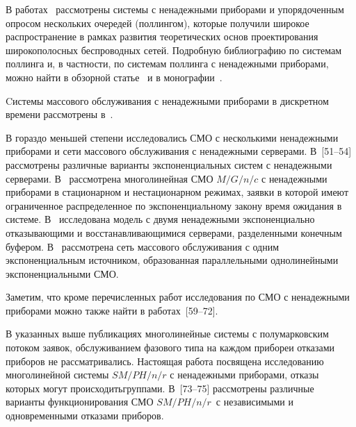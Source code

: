 \begin{multicols}{2}
В работах~\cite{Ibe-Trivedi_1990, Boxma-Weststrate-Yechiali_1993, Blanc-Mei_1994, Kofman-Yechiali_1996, Almasi_1999, Nakdimon-Yechiali_2001}
рассмотрены системы с ненадежными приборами и упорядоченным опросом нескольких очередей (поллингом),
которые получили широкое распространение в рамках развития теоретических основ
проектирования широкополосных беспроводных сетей.
Подробную библиографию по системам поллинга и, в част\-ности, по системам поллинга с ненадежными приборами,
можно найти в обзорной статье~\cite{Vishnevsky-Semenova_2006} и в монографии~\cite{Vishnevsky-Semenova_2007}.

Cистемы массового обслуживания с ненадежными приборами в дискретном времени
рас\-смот\-ре\-ны в~\cite{Dimitrov-Dokev_1981, Lee_1997, Moreno_2006, Atencia-Moreno_2006}.

В гораздо меньшей степени исследовались СМО с несколькими ненадежными приборами
и сети массового обслуживания с ненадежными серверами.
В~[51--54] рассмотрены
различные варианты экспоненциальных систем с ненадежными серверами.
В~\cite{Mikadze-Mikadze-Khocholava_2007} рассмотрена многолинейная СМО $M/G/n/c$ с ненадежными приборами
в стацио\-нарном и нестационарном режимах, заявки в которой имеют
ограниченное распределенное по экспоненциальному закону время ожидания в системе.
В~\cite{Chakravarthy_1987} исследована модель с двумя ненадежными экспоненциально отказывающими
и восстанавливающимися серверами, разделенными конечным буфером.
В~\cite{Tananko-Yudaeva_2007_1, Tananko-Yudaeva_2007_2}
рассмотрена сеть массового обслуживания с одним экспоненциальным источником,
образованная параллельными однолинейными экспоненциальными СМО.

Заметим, что кроме перечисленных работ исследования по СМО
с ненадежными приборами можно также найти в работах~[59--72].

В указанных выше публикациях многолинейные системы с полумарковским потоком заявок,
обслуживанием фазового типа на каждом приборе\linebreak и отказами приборов не рассматривались.
На\-сто\-ящая работа посвящена исследованию многолинейной системы $SM/PH/n/r$ с ненадежными приборами,
отказы которых могут происходить\linebreak группами.
В~[73--75] рассмотрены различные варианты функционирования
СМО $SM/PH/n/r$\ с независимыми и одновременными отказами приборов.
{

}
\end{multicols}

